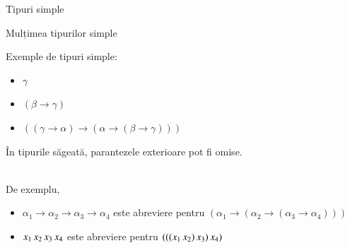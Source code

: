 \documentclass[xcolor=pdftex,romanian,colorlinks]{beamer}
\begin{document}
\begin{frame}{Tipuri simple}

\begin{center}
 \alert{Mulțimea tipurilor simple} \hspace{.2cm} 
\end{center}

{\color{True} Exemple de tipuri simple:}  
\vspace{-.2cm}
\begin{itemize}
	\item $\gamma$
	\item $(\beta \to \gamma)$
	\item $((\gamma \to \alpha) \to (\alpha \to (\beta \to \gamma)))$
\end{itemize}

\medskip
În tipurile săgeată, parantezele exterioare pot fi omise.

\medskip
{} \\
De exemplu,
\vspace{-.2cm}
\begin{itemize}
	\item $\alpha_1 \to \alpha_2 \to \alpha_3 \to \alpha_4$ este abreviere pentru $(\alpha_1 \to (\alpha_2 \to (\alpha_3 \to \alpha_4)))$
	\item $x_1\, x_2\, x_3\, x_4$ este abreviere pentru $(((x_1\, x_2)\, x_3)\, x_4)$
\end{itemize}
\end{frame}
\end{document}
